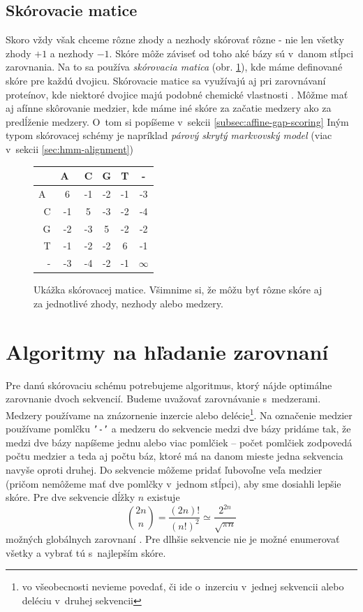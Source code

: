 \subsection{Skórovacie matice}
Skoro vždy však chceme rôzne zhody a nezhody skórovať rôzne - nie len všetky zhody $+1$ a nezhody $-1$.
Skóre môže záviseť od toho aké bázy sú v~danom stĺpci zarovnania. Na to sa používa \textit{skórovacia matica} (obr. \ref{fig:scoringmatrix}), kde máme definované skóre pre každú dvojicu. Skórovacie matice sa využívajú aj pri zarovnávaní proteínov, kde niektoré dvojice majú podobné chemické vlastnosti
\cite{durbin, skripta}.
Môžme mať aj afínne skôrovanie medzier, kde máme iné skóre za začatie medzery ako za predĺženie medzery. O~tom si popíšeme v~sekcii \ref{subsec:affine-gap-scoring}
Iným typom skórovacej schémy je napríklad \textit{párový skrytý markvovský model} (viac v~sekcii \ref{sec:hmm-alignment})

\begin{figure}[hbtp]
    \centering
    \begin{tabular}{r|ccccc}
    & A~& C & G & T & -\\
    \hline
    A~& 6 & -1 & -2 & -1 & -3\\
    C & -1 & 5 & -3 & -2 & -4\\
    G & -2 & -3 & 5 & -2 & -2\\
    T & -1 & -2 & -2 & 6 & -1\\
    - & -3 & -4 & -2 & -1 & $\infty$\\
    \end{tabular}
    \caption[Skórovacia matica]{Ukážka skórovacej matice. Všimnime si, že môžu byť rôzne skóre aj za jednotlivé zhody, nezhody alebo medzery.}
    \label{fig:scoringmatrix}
\end{figure}

\section[Algoritmy]{Algoritmy na hľadanie zarovnaní}
Pre danú skórovaciu schému potrebujeme algoritmus, ktorý nájde optimálne zarovnanie dvoch sekvencií.
Budeme uvažovať zarovnávanie s~medzerami. Medzery používame na znázornenie inzercie alebo delécie\footnote{vo všeobecnosti nevieme povedať, či ide o~inzerciu v~jednej sekvencii alebo deléciu v~druhej sekvencii}. Na označenie medzier používame pomlčku {\tt'-'} a medzeru do sekvencie medzi dve bázy pridáme tak, že medzi dve bázy napíšeme jednu alebo viac pomlčiek -- počet pomlčiek zodpovedá počtu medzier a teda aj počtu báz, ktoré má na danom mieste jedna sekvencia navyše oproti druhej. Do sekvencie môžeme pridať ľubovoľne veľa medzier (pričom nemôžeme mať dve pomlčky v~jednom stĺpci), aby sme dosiahli lepšie skóre. Pre dve sekvencie dĺžky $n$ existuje
$$ {2n \choose n}  = \frac{(2n)!}{(n!)^2} \simeq \frac{2^{2n}}{\sqrt{\pi n}} $$
možných globálnych zarovnaní \cite{durbin}. Pre dlhšie sekvencie nie je možné enumerovať všetky a vybrať tú s~najlepším skóre.

